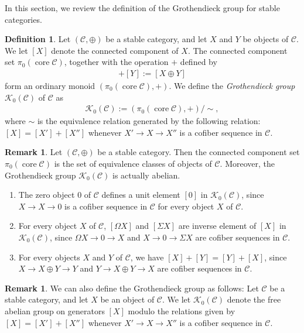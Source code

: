 \documentclass[a4paper,dvipdfmx,11pt,reqno]{amsart}
\newcommand{\C}{\mathcal{C}}
\newcommand{\K}{\mathcal{K}}
\DeclareMathOperator{\core}{core}
\theoremstyle{definition}
\newtheorem{definition}[theorem]{Definition}
\newtheorem{remark}[theorem]{Remark}
\begin{document}
In this section, we review the definition of the Grothendieck group for stable categories.

\begin{definition} \label{Ber.def.2.1}
  Let $(\C,\oplus)$ be a stable category, and let $X$ and $Y$ be objects of $\C$.
  We let $[X]$ denote the connected component of $X$.
  The connected component set $\pi_0(\core\C)$, together with the operation $+$ defined by 
  \begin{align*}
    [X] + [Y] := [X \oplus Y]
  \end{align*}
  form an ordinary monoid $(\pi_0(\core\C),+)$.
  We define the \textit{Grothendieck group} $\K_0(\C)$ of $\C$ as 
  \begin{align*}
    \K_0(\C) := (\pi_0(\core\C),+) / \sim,
  \end{align*}
  where $\sim$ is the equivalence relation generated by the following relation:
  $[X]=[X']+[X'']$ whenever $X' \to X \to X''$ is a cofiber sequence in $\C$.
\end{definition}

\begin{remark} \label{Ber.rem.2.2}
  Let $(\C,\oplus)$ be a stable category.
  Then the connected component set $\pi_0(\core\C)$ is the set of equivalence classes of objects of $\C$.
  Moreover, the Grothendieck group $\K_0(\C)$ is actually abelian.
  \begin{enumerate}
    \item The zero object $0$ of $\C$ defines a unit element $[0]$ in $\K_0(\C)$, since $X \to X \to 0$ is a cofiber sequence in $\C$ for every object $X$ of $\C$.
    \item For every object $X$ of $\C$, $[\Omega X]$ and $[\Sigma X]$ are inverse element of $[X]$ in $\K_0(\C)$, since $\Omega X \to 0 \to X$ and $X \to 0 \to \Sigma X$ are cofiber sequences in $\C$.
    \item For every objects $X$ and $Y$ of $\C$, we have $[X]+[Y]=[Y]+[X]$, since $X \to X \oplus Y \to Y$ and $Y \to X \oplus Y \to X$ are cofiber sequences in $\C$.
  \end{enumerate}
\end{remark}   

\begin{remark} \label{Lur.def.14.10}
  We can also define the Grothendieck group as follows:
  Let $\C$ be a stable category, and let $X$ be an object of $\C$.
  We let $\K_0(\C)$ denote the free abelian group on generators $[X]$ modulo the relations given by $[X] = [X'] + [X'']$ whenever $X' \to X \to X''$ is a cofiber sequence in $\C$.
\end{remark}
\end{document}
